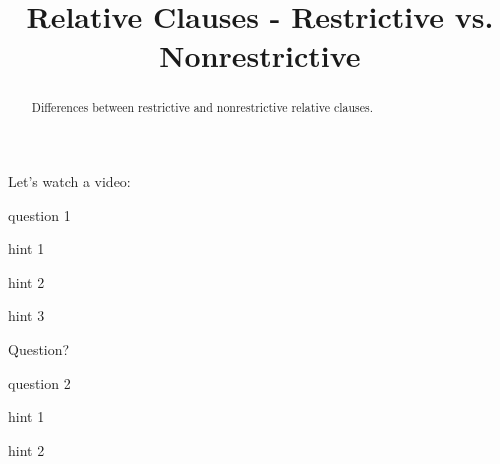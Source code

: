 \documentclass{ximera}
\title{Relative Clauses - Restrictive vs. Nonrestrictive}
\begin{document}
\begin{abstract}
Differences between restrictive and nonrestrictive relative clauses.
\end{abstract}
\maketitle

Let's watch a video:

\begin{question}
question 1
\begin{solution}
\begin{hint}
hint 1
\end{hint}
\begin{hint}
hint 2
\end{hint}
\begin{hint}
hint 3
\end{hint}
Question?
\end{solution}
\end{question}

\begin{question}
question 2
\begin{solution}
\begin{multiple-choice}
\end{multiple-choice}
\begin{hint}
hint 1
\end{hint}
\begin{hint}
hint 2
\end{hint}
\end{solution}
\end{question}
\end{document}
